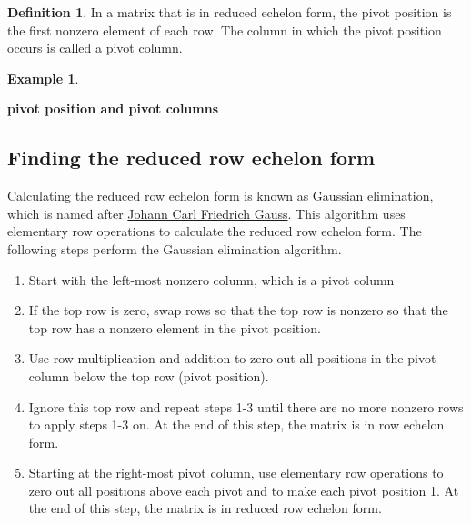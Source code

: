 \documentclass[
]{book}
\providecommand{\tightlist}{%
  \setlength{\itemsep}{0pt}\setlength{\parskip}{0pt}}
\theoremstyle{definition}
\newtheorem{definition}{Definition}[chapter]
\theoremstyle{definition}
\newtheorem{example}{Example}[chapter]
\theoremstyle{definition}
\theoremstyle{remark}
\begin{document}
\begin{definition}
\protect\hypertarget{def:unnamed-chunk-59}{}{\label{def:unnamed-chunk-59} }In a matrix that is in reduced echelon form, the pivot position is the first nonzero element of each row. The column in which the pivot position occurs is called a pivot column.
\end{definition}

\begin{example}
\protect\hypertarget{exm:unlabeled-div-61}{}\label{exm:unlabeled-div-61}

\textbf{pivot position and pivot columns}

\end{example}

\hypertarget{finding-the-reduced-row-echelon-form}{%
\subsection{Finding the reduced row echelon form}\label{finding-the-reduced-row-echelon-form}}

Calculating the reduced row echelon form is known as Gaussian elimination, which is named after \href{https://en.wikipedia.org/wiki/Carl_Friedrich_Gauss}{Johann Carl Friedrich Gauss}. This algorithm uses elementary row operations to calculate the reduced row echelon form. The following steps perform the Gaussian elimination algorithm.

\begin{enumerate}
\def\labelenumi{\arabic{enumi})}
\tightlist
\item
  Start with the left-most nonzero column, which is a pivot column
\item
  If the top row is zero, swap rows so that the top row is nonzero so that the top row has a nonzero element in the pivot position.
\item
  Use row multiplication and addition to zero out all positions in the pivot column below the top row (pivot position).
\item
  Ignore this top row and repeat steps 1-3 until there are no more nonzero rows to apply steps 1-3 on. At the end of this step, the matrix is in row echelon form.
\item
  Starting at the right-most pivot column, use elementary row operations to zero out all positions above each pivot and to make each pivot position 1. At the end of this step, the matrix is in reduced row echelon form.
\end{enumerate}
\end{document}
